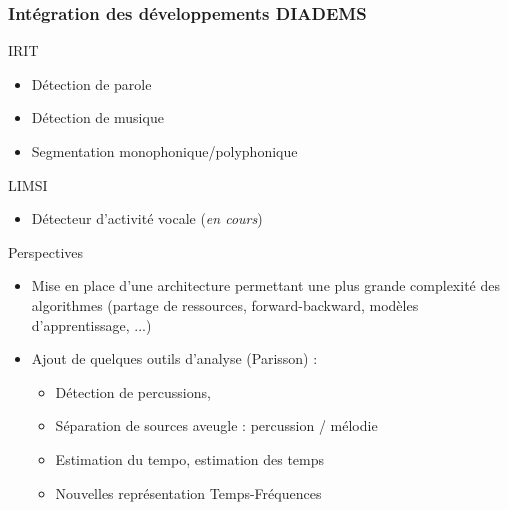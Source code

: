 \documentclass[10pt, final, hyperref, table]{beamer}
\begin{document}
\begin{frame}
  \frametitle{Intégration des développements DIADEMS}
  \begin{block}{IRIT}
    \begin{itemize}
    \item Détection de parole
    \item Détection de musique 
    \item Segmentation monophonique/polyphonique 
    \end{itemize}
  \end{block}
  \begin{block}{LIMSI}
    \begin{itemize}
    \item Détecteur d'activité vocale (\emph{en cours})
    \end{itemize}
  \end{block}
  \begin{block}{Perspectives}
    \begin{itemize}
    \item Mise en place d'une architecture permettant une plus grande complexité des algorithmes (partage de ressources, forward-backward, modèles d'apprentissage, ...)
    \item Ajout de quelques outils d'analyse (Parisson) :
      \begin{itemize}
      \item Détection de percussions,
      \item Séparation de sources aveugle : percussion / mélodie
      \item Estimation du tempo, estimation des temps
      \item Nouvelles représentation Temps-Fréquences 
      \end{itemize}

    \end{itemize}
    
  \end{block}
\end{frame}
\end{document}

